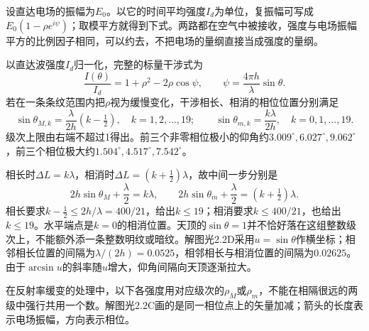 \documentclass[UTF8,fontset=fandol,a4paper,11pt]{ctexart}
\begin{document}
设直达电场的振幅为$E_0$。以它的时间平均强度$I_d$为单位，复振幅可写成$E_0(1-\rho e^{i\psi})$；取模平方就得到下式。两路都在空气中被接收，强度与电场振幅平方的比例因子相同，可以约去，不把电场的量纲直接当成强度的量纲。

以直达波强度$I_d$归一化，完整的标量干涉式为
\[
\boxed{\frac{I(\theta)}{I_d}
=1+\rho^2-2\rho\cos\psi,\qquad
\psi=\frac{4\pi h}{\lambda}\sin\theta.}
\]
若在一条条纹范围内把$\rho$视为缓慢变化，干涉相长、相消的相位位置分别满足
\[
\sin\theta_{M,k}=\frac{\lambda}{2h}(k-\tfrac12),\quad k=1,2,\ldots,19;
\qquad
\sin\theta_{m,k}=\frac{k\lambda}{2h},\quad k=0,1,\ldots,19.
\]
级次上限由右端不超过1得出。前三个非零相位极小的仰角约$3.009^\circ,6.027^\circ,9.062^\circ$，前三个相位极大约$1.504^\circ,4.517^\circ,7.542^\circ$。


相长时$\Delta L=k\lambda$，相消时$\Delta L=(k+\tfrac12)\lambda$，故中间一步分别是
\[
2h\sin\theta_M+\frac{\lambda}{2}=k\lambda,\qquad
2h\sin\theta_m+\frac{\lambda}{2}=(k+\tfrac12)\lambda .
\]
相长要求$k-\tfrac12\le2h/\lambda=400/21$，给出$k\le19$；相消要求$k\le400/21$，也给出$k\le19$。水平端点是$k=0$的相消位置。天顶的$\sin\theta=1$并不恰好落在这组整数级次上，不能额外添一条整数明纹或暗纹。解图光2.2D采用$u=\sin\theta$作横坐标；相邻相长位置的间隔为$\lambda/(2h)=0.0525$，相邻相长与相消位置的间隔为$0.02625$。由于$\arcsin u$的斜率随$u$增大，仰角间隔向天顶逐渐拉大。

在反射率缓变的处理中，以下各强度用对应级次的$\rho_M$或$\rho_m$，不能在相隔很远的两级中强行共用一个数。解图光2.2C画的是同一相位点上的矢量加减；箭头的长度表示电场振幅，方向表示相位。
\end{document}
